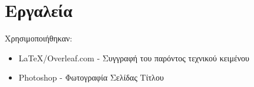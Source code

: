 \documentclass{article}
\begin{document}
\section{Εργαλεία}
Χρησιμοποιήθηκαν:
\begin{itemize}

    \item \LaTeX/Overleaf.com - Συγγραφή του παρόντος τεχνικού κειμένου
    \item Photoshop - Φωτογραφία Σελίδας Τίτλου
    
\end{itemize}
\end{document}
